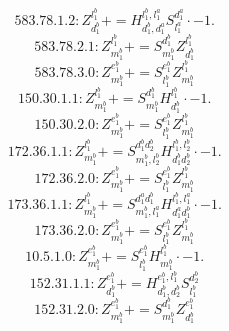 \documentclass[letterpaper,10pt,fleqn,leqno,onecolumn]{article}
\begin{document}
\begin{equation} \;\;\;\;\;\;  583.78.1.2: Z^{l_{1}^{b}}_{d_{1}^{b}}+=H^{l_{1}^{b},l_{1}^{a}}_{d_{1}^{b},d_{1}^{a}}S^{d_{1}^{a}}_{l_{1}^{a}}\cdot -1. \end{equation}
\begin{equation} \;\;\;\;\;\;  583.78.2.1: Z^{l_{1}^{b}}_{m_{1}^{b}}+=S^{d_{1}^{b}}_{m_{1}^{b}}Z^{l_{1}^{b}}_{d_{1}^{b}} \end{equation}
\begin{equation} \;\;\;\;\;\;  583.78.3.0: Z^{e_{1}^{b}}_{m_{1}^{b}}+=S^{e_{1}^{b}}_{l_{1}^{b}}Z^{l_{1}^{b}}_{m_{1}^{b}} \end{equation}
\begin{equation} \;\;\;\;\;\;  150.30.1.1: Z^{l_{1}^{b}}_{m_{1}^{b}}+=S^{d_{1}^{b}}_{m_{1}^{b}}H^{l_{1}^{b}}_{d_{1}^{b}}\cdot -1. \end{equation}
\begin{equation} \;\;\;\;\;\;  150.30.2.0: Z^{e_{1}^{b}}_{m_{1}^{b}}+=S^{e_{1}^{b}}_{l_{1}^{b}}Z^{l_{1}^{b}}_{m_{1}^{b}} \end{equation}
\begin{equation} \;\;\;\;\;\;  172.36.1.1: Z^{l_{1}^{b}}_{m_{1}^{b}}+=S^{d_{1}^{b}d_{2}^{b}}_{m_{1}^{b},l_{2}^{b}}H^{l_{1}^{b},l_{2}^{b}}_{d_{1}^{b}d_{2}^{b}}\cdot -1. \end{equation}
\begin{equation} \;\;\;\;\;\;  172.36.2.0: Z^{e_{1}^{b}}_{m_{1}^{b}}+=S^{e_{1}^{b}}_{l_{1}^{b}}Z^{l_{1}^{b}}_{m_{1}^{b}} \end{equation}
\begin{equation} \;\;\;\;\;\;  173.36.1.1: Z^{l_{1}^{b}}_{m_{1}^{b}}+=S^{d_{1}^{a}d_{1}^{b}}_{m_{1}^{b},l_{1}^{a}}H^{l_{1}^{b},l_{1}^{a}}_{d_{1}^{a}d_{1}^{b}}\cdot -1. \end{equation}
\begin{equation} \;\;\;\;\;\;  173.36.2.0: Z^{e_{1}^{b}}_{m_{1}^{b}}+=S^{e_{1}^{b}}_{l_{1}^{b}}Z^{l_{1}^{b}}_{m_{1}^{b}} \end{equation}
\begin{equation} \;\;\;\;\;\;  10.5.1.0: Z^{e_{1}^{b}}_{m_{1}^{b}}+=S^{e_{1}^{b}}_{l_{1}^{b}}H^{l_{1}^{b}}_{m_{1}^{b}}\cdot -1. \end{equation}
\begin{equation} \;\;\;\;\;\;  152.31.1.1: Z^{e_{1}^{b}}_{d_{1}^{b}}+=H^{e_{1}^{b},l_{1}^{b}}_{d_{1}^{b},d_{2}^{b}}S^{d_{2}^{b}}_{l_{1}^{b}} \end{equation}
\begin{equation} \;\;\;\;\;\;  152.31.2.0: Z^{e_{1}^{b}}_{m_{1}^{b}}+=S^{d_{1}^{b}}_{m_{1}^{b}}Z^{e_{1}^{b}}_{d_{1}^{b}} \end{equation}
\end{document}
